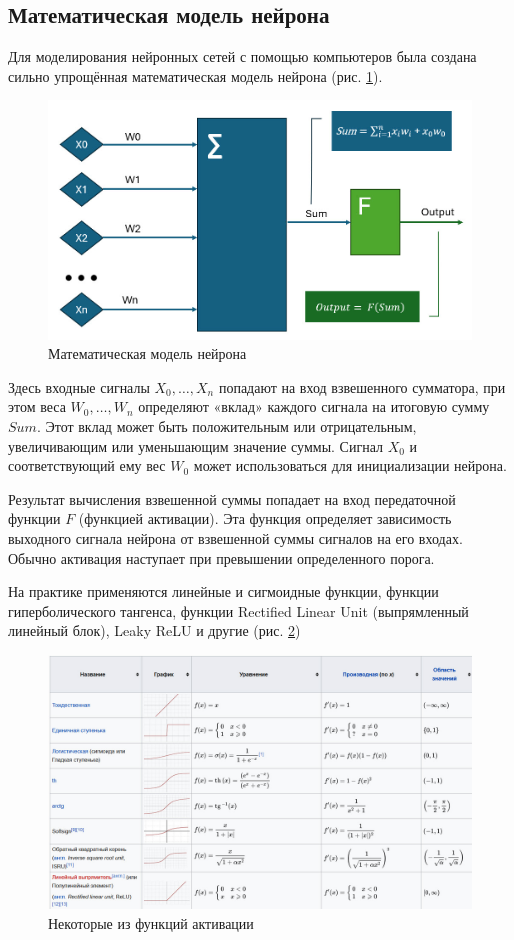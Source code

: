 
\subsection{Математическая модель нейрона}

Для моделирования нейронных сетей с помощью компьютеров была создана сильно упрощённая математическая модель нейрона (рис. \ref{neuron}).

\begin{figure}[H]
    \centering
    \includegraphics[width = 12cm]{neuron.jpg}
    \caption{Математическая модель нейрона}
    \label{neuron}
\end{figure}

Здесь входные сигналы $X_0,…,X_n$ попадают на вход взвешенного сумматора, при этом веса $W_0,…,W_n$ определяют «вклад» каждого сигнала на итоговую сумму $Sum$. Этот вклад может быть положительным или отрицательным, увеличивающим или уменьшающим значение суммы. Сигнал $X_0$ и соответствующий ему вес $W_0$ может использоваться для инициализации нейрона.

Результат вычисления взвешенной суммы попадает на вход передаточной функции $F$ (функцией активации). Эта функция определяет зависимость выходного сигнала нейрона от взвешенной суммы сигналов на его входах. Обычно активация наступает при превышении определенного порога.

На практике применяются линейные и сигмоидные функции, функции гиперболического тангенса, функции Rectified Linear Unit (выпрямленный линейный блок), Leaky ReLU и другие (рис. \ref{funcs})

\begin{figure}[H]
    \centering
    \includegraphics[width = 12cm]{funcs.jpg}
    \caption{Некоторые из функций активации}
    \label{funcs}
\end{figure}

